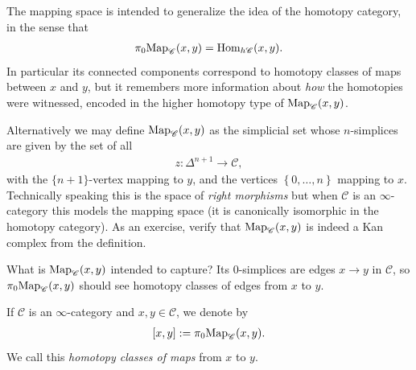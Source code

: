 \documentclass[11pt,openany]{book}
\begin{document}
\begin{intuition} The mapping space is intended to generalize the idea of the homotopy category, in the sense that
\begin{align*}
    \pi_0 \mathrm{Map}_\mathscr{C}(x,y) = \mathrm{Hom}_{h\mathscr{C}}(x,y).
\end{align*}
In particular its connected components correspond to homotopy classes of maps between $x$ and $y$, but it remembers more information about \textit{how} the homotopies were witnessed, encoded in the higher homotopy type of $\mathrm{Map}_\mathscr{C}(x,y)$.
\end{intuition}




\begin{remark} 
Alternatively we may define $\mathrm{Map}_\mathscr{C}(x,y)$ as the simplicial set whose $n$-simplices are given by the set of all
\begin{align*}
    z \colon \Delta^{n+1} \to \mathscr{C},
\end{align*}
with the $\{n+1\}$-vertex mapping to $y$, and the vertices $\left\{ 0, \ldots, n \right\}$ mapping to $x$. 
Technically speaking this is the space of \textit{right morphisms} but when $\mathscr{C}$ is an $\infty$-category this models the mapping space (it is canonically isomorphic in the homotopy category). As an exercise, verify that $\mathrm{Map}_{\mathscr{C}}(x,y)$ is indeed a Kan complex from the definition.
\end{remark}

What is $\mathrm{Map}_\mathscr{C}(x,y)$ intended to capture? Its 0-simplices are edges $x \to y$ in $\mathscr{C}$, so $\pi_0 \mathrm{Map}_{\mathscr{C}}(x,y)$ should see homotopy classes of edges from $x$ to $y$.

\begin{notation} If $\mathscr{C}$ is an $\infty$-category and $x,y\in\mathscr{C}$, we denote by
\begin{align*}
    \left[ x,y \right] := \pi_0 \mathrm{Map}_{\mathscr{C}}(x,y).
\end{align*}
We call this \textit{homotopy classes of maps} from $x$ to $y$.
\end{notation}

\end{document}
